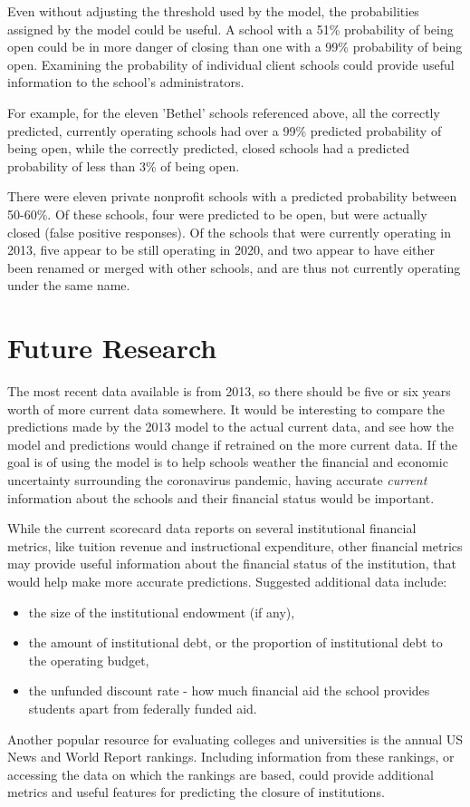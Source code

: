 \documentclass[11pt, letterpaper]{article}
\begin{document}
\begin{enumerate}
Even without adjusting the threshold used by the model, the probabilities assigned by the model could be useful. A school with a 51\% probability of being open could be in more danger of closing than one with a 99\% probability of being open. Examining the probability of individual client schools could provide useful information to the school's administrators.

For example, for the eleven 'Bethel' schools referenced above, all the correctly predicted, currently operating schools had over a 99\% predicted probability of being open, while the correctly predicted, closed schools had a predicted probability of less than 3\% of being open.

There were eleven private nonprofit schools with a predicted probability between 50-60\%. Of these schools, four were predicted to be open, but were actually closed (false positive responses). Of the schools that were currently operating in 2013, five appear to be still operating in 2020, and two appear to have either been renamed or merged with other schools, and are thus not currently operating under the same name.
\end{enumerate}

\section{Future Research}

The most recent data available is from 2013, so there should be five or six years worth of more current data somewhere. It would be interesting to compare the predictions made by the 2013 model to the actual current data, and see how the model and predictions would change if retrained on the more current data. If the goal is of using the model is to help schools weather the financial and economic uncertainty surrounding the coronavirus pandemic, having accurate \textit{current} information about the schools and their financial status would be important.

While the current scorecard data reports on several institutional financial metrics, like tuition revenue and instructional expenditure, other financial metrics may provide useful information about the financial status of the institution, that would help make more accurate predictions. Suggested additional data include:
\begin{itemize}
\item the size of the institutional endowment (if any),
\item the amount of institutional debt, or the proportion of institutional debt to the operating budget,
\item the unfunded discount rate - how much financial aid the school provides students apart from federally funded aid.
\end{itemize}

Another popular resource for evaluating colleges and universities is the annual US News and World Report rankings. Including information from these rankings, or accessing the data on which the rankings are based, could provide additional metrics and useful features for predicting the closure of institutions.
\end{document}
